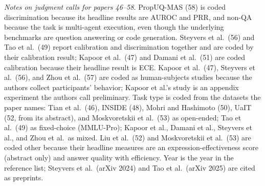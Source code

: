 \documentclass[acmsmall]{acmart}
\begin{document}
\smallskip
\noindent\emph{Notes on judgment calls for papers 46--58.} PropUQ-MAS (58) is coded discrimination because its headline results are AUROC and PRR, and non-QA because the task is multi-agent execution, even though the underlying benchmarks are question answering or code generation. Steyvers et al.\ (56) and Tao et al.\ (49) report calibration and discrimination together and are coded by their calibration result; Kapoor et al.\ (47) and Damani et al.\ (51) are coded calibration because their headline result is ECE. Kapoor et al.\ (47), Steyvers et al.\ (56), and Zhou et al.\ (57) are coded as human-subjects studies because the authors collect participants' behavior; Kapoor et al.'s study is an appendix experiment the authors call preliminary. Task type is coded from the datasets the paper names: Tian et al.\ (46), INSIDE (48), Mohri and Hashimoto (50), UaIT (52, from its abstract), and Moskvoretskii et al.\ (53) as open-ended; Tao et al.\ (49) as fixed-choice (MMLU-Pro); Kapoor et al., Damani et al., Steyvers et al., and Zhou et al.\ as mixed. Liu et al.\ (52) and Moskvoretskii et al.\ (53) are coded other because their headline measures are an expression-effectiveness score (abstract only) and answer quality with efficiency. Year is the year in the reference list; Steyvers et al.\ (arXiv 2024) and Tao et al.\ (arXiv 2025) are cited as preprints.
\end{document}
